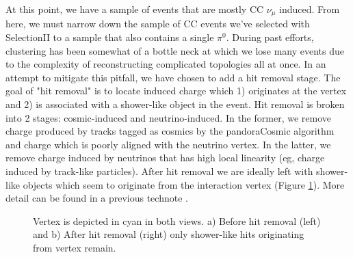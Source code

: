 \documentclass[a4paper]{article}
\begin{document}
At this point, we have a sample of events that are mostly CC $\nu_\mu$ induced. From here, we must narrow down the sample of CC events we've selected with SelectionII to a sample that also contains a single $\pi^0$. During past efforts, clustering has been somewhat of a bottle neck at which we lose many events due to the complexity of reconstructing complicated topologies all at once. In an attempt to mitigate this pitfall, we have chosen to add a hit removal stage. The goal of "hit removal" is to locate induced charge which 1) originates at the vertex and 2) is associated with a shower-like object in the event. Hit removal is broken into 2 stages: cosmic-induced and neutrino-induced.  In the former, we remove charge produced by tracks tagged as cosmics by the pandoraCosmic algorithm and charge which is poorly aligned with the neutrino vertex.  In the latter, we remove charge induced by neutrinos that has high local linearity (eg, charge induced by track-like particles). After hit removal we are ideally left with shower-like objects which seem to originate from the interaction vertex (Figure \ref{fig:hitremoval}). More detail can be found in a previous technote \cite{bib:5864}. 

\begin{figure}[h!]
\centering
{}
\hspace{1 mm}
\caption{Vertex is depicted in cyan in both views. a) Before hit removal (left) and b) After hit removal (right) only shower-like hits originating from vertex remain. }
\label{fig:hitremoval}
\end{figure}
\end{document}
